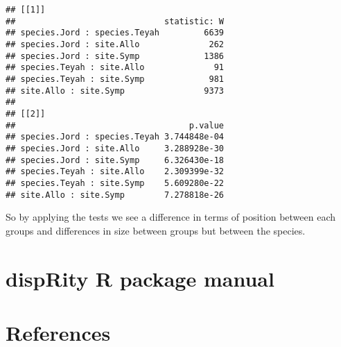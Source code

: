 \documentclass[
]{book}
\begin{document}
\begin{verbatim}
## [[1]]
##                              statistic: W
## species.Jord : species.Teyah         6639
## species.Jord : site.Allo              262
## species.Jord : site.Symp             1386
## species.Teyah : site.Allo              91
## species.Teyah : site.Symp             981
## site.Allo : site.Symp                9373
## 
## [[2]]
##                                   p.value
## species.Jord : species.Teyah 3.744848e-04
## species.Jord : site.Allo     3.288928e-30
## species.Jord : site.Symp     6.326430e-18
## species.Teyah : site.Allo    2.309399e-32
## species.Teyah : site.Symp    5.609280e-22
## site.Allo : site.Symp        7.278818e-26
\end{verbatim}

So by applying the tests we see a difference in terms of position between each groups and differences in size between groups but between the species.

\hypertarget{disprity-r-package-manual}{%
\chapter{dispRity R package manual}\label{disprity-r-package-manual}}

\hypertarget{references}{%
\chapter{References}\label{references}}

  
\end{document}
